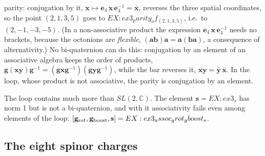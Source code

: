 \documentclass[aps,prd,twocolumn,superscriptaddress,nofootinbib,floatfix,longbibliography]{revtex4-2}
\newcommand{\e}[1]{\mathbf e_{#1}}
\begin{document}
parity: conjugation by it, $\mathbf x\mapsto\e4\,\mathbf x\,\e4^{-1}=\bar{\mathbf x}$, reverses the three spatial
coordinates, so the point $(2,1,3,5)$ goes to ${{EX:ex3_parity_of_(2,1,3,5)}}$, i.e.\ to $(2,-1,-3,-5)$. (In a
non-associative product the expression $\e4\,\mathbf x\,\e4^{-1}$ needs no brackets, because the octonions are
\emph{flexible}, $(\mathbf a\mathbf b)\mathbf a=\mathbf a(\mathbf b\mathbf a)$, a consequence of alternativity.) No
bi-quaternion can do this: conjugation by an element of an associative algebra keeps the order of products,
$\mathbf g(\mathbf x\mathbf y)\mathbf g^{-1}=(\mathbf g\mathbf x\mathbf g^{-1})(\mathbf g\mathbf y\mathbf g^{-1})$, while
the bar reverses it, $\overline{\mathbf x\mathbf y}=\bar{\mathbf y}\,\bar{\mathbf x}$. In the loop, whose product is not
associative, the parity is conjugation by an element.

The loop contains much more than $SL(2,\mathbb C)$. The element $\mathbf s={{EX:ex3_s}}$ has norm 1 but is not a
bi-quaternion, and with it associativity fails even among elements of the loop:
$[\mathbf g_{\rm rot},\mathbf g_{\rm boost},\mathbf s]={{EX:ex3_assoc_grot_gboost_s}}$.

\subsection{The eight spinor charges}
\label{sec:charges}
\end{document}
